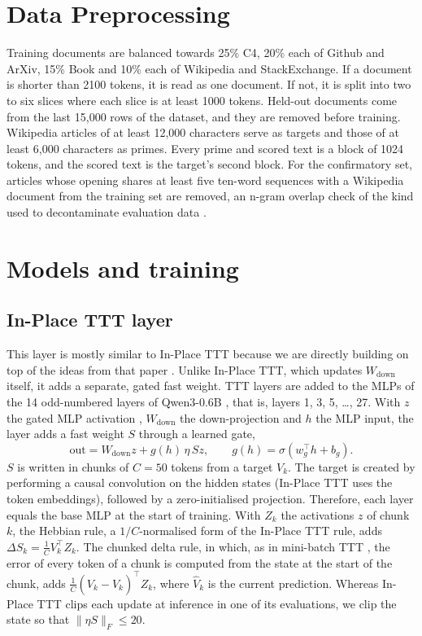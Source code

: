 \documentclass[12pt,a4paper]{report}
\begin{document}
\section{Data Preprocessing}

Training documents are balanced towards 25\% C4, 20\% each of Github and ArXiv, 15\% Book and 10\% each of Wikipedia and StackExchange. If a document is shorter than 2100 tokens, it is read as one document. If not, it is split into two to six slices where each slice is at least 1000 tokens. Held-out documents come from the last 15{,}000 rows of the dataset, and they are removed before training. Wikipedia articles of at least 12{,}000 characters serve as targets and those of at least 6{,}000 characters as primes. Every prime and scored text is a block of 1024 tokens, and the scored text is the target's second block. For the confirmatory set, articles whose opening shares at least five ten-word sequences with a Wikipedia document from the training set are removed, an n-gram overlap check of the kind used to decontaminate evaluation data \citep{brown2020language}.

\section{Models and training}

\subsection{In-Place TTT layer}
\label{sec-inplace}
This layer is mostly similar to In-Place TTT because we are directly building on top of the ideas from that paper \citep{feng2026inplace}. Unlike In-Place TTT, which updates $W_{\mathrm{down}}$ itself, it adds a separate, gated fast weight. TTT layers are added to the MLPs of the 14 odd-numbered layers of Qwen3-0.6B \citep{yang2025qwen3}, that is, layers 1, 3, 5, \dots, 27. With $z$ the gated MLP activation \citep{shazeer2020glu}, $W_{\mathrm{down}}$ the down-projection and $h$ the MLP input, the layer adds a fast weight $S$ through a learned gate,
\begin{equation}
  \mathrm{out} = W_{\mathrm{down}} z + g(h)\, \eta\, S z , \qquad g(h) = \sigma(w_g^\top h + b_g).
\end{equation}
$S$ is written in chunks of $C = 50$ tokens from a target $V_k$. The target is created by performing a causal convolution on the hidden states (In-Place TTT uses the token embeddings), followed by a zero-initialised projection. Therefore, each layer equals the base MLP at the start of training. With $Z_k$ the activations $z$ of chunk $k$, the Hebbian rule, a $1/C$-normalised form of the In-Place TTT rule, adds $\Delta S_k = \tfrac{1}{C} V_k^\top Z_k$. The chunked delta rule, in which, as in mini-batch TTT \citep{sun2025learning}, the error of every token of a chunk is computed from the state at the start of the chunk, adds $\tfrac{1}{C}(V_k - \hat V_k)^\top Z_k$, where $\hat V_k$ is the current prediction. Whereas In-Place TTT clips each update at inference in one of its evaluations, we clip the state so that $\lVert \eta S \rVert_F \le 20$.
\end{document}
